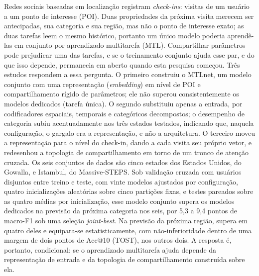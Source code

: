 \begin{resumo}[Resumo]
        \noindent Redes sociais baseadas em localização registram \emph{check-ins}: visitas
        de um usuário a um ponto de interesse (POI). Duas propriedades da próxima visita
        merecem ser antecipadas, sua categoria e sua região, mas não o ponto de interesse
        exato; as duas tarefas leem o mesmo histórico, portanto um único modelo poderia
        aprendê-las em conjunto por aprendizado multitarefa (MTL). Compartilhar parâmetros
        pode prejudicar uma das tarefas, e se o treinamento conjunto ajuda esse par, e do que
        isso depende, permanecia em aberto quando esta pesquisa começou. Três estudos
        respondem a essa pergunta. O primeiro construiu o MTLnet, um modelo conjunto com uma
        representação (\emph{embedding}) em nível de POI e compartilhamento rígido de
        parâmetros; ele não superou consistentemente os modelos dedicados (tarefa única). O
        segundo substituiu apenas a entrada, por codificadores espaciais, temporais e
        categóricos decompostos; o desempenho de categoria subiu acentuadamente nos três
        estados testados, indicando que, naquela configuração, o gargalo era a representação,
        e não a arquitetura. O terceiro
        moveu a representação para o nível do check-in, dando a cada visita seu próprio
        vetor, e redesenhou a topologia de compartilhamento em torno de um tronco de atenção
        cruzada. Os seis conjuntos de dados são cinco estados dos Estados Unidos, do Gowalla,
        e Istambul, do Massive-STEPS. Sob validação cruzada com usuários disjuntos entre
        treino e teste, com vinte modelos ajustados por configuração, quatro inicializações
        aleatórias sobre cinco partições fixas, e testes pareados sobre as quatro médias por
        inicialização, esse modelo conjunto supera os modelos dedicados na previsão da próxima
        categoria nos seis, por 5,3 a 9,4 pontos de macro-F1 sob uma seleção
        \emph{joint-best}. Na previsão da próxima região, supera em quatro deles e
        equipara-se estatisticamente, com não-inferioridade dentro de uma margem de dois
        pontos de Acc@10 (TOST), nos outros dois. A resposta é, portanto, condicional: se o
        aprendizado multitarefa ajuda depende da representação de entrada e da topologia de
        compartilhamento construída sobre ela.


\end{resumo}
